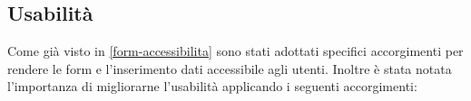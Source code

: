 \subsection{Usabilità}
\label{form-usabilita}
Come già visto in \ref{form-accessibilita} sono stati adottati specifici accorgimenti per rendere le form e l'inserimento dati accessibile agli utenti. Inoltre è stata notata l'importanza di migliorarne l'usabilità applicando i seguenti accorgimenti: %
